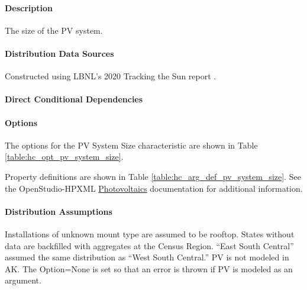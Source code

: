 \paragraph{Description}
% 
The size of the PV system.

\paragraph{Distribution Data Sources}
% 
Constructed using LBNL's 2020 Tracking the Sun report \citep{LBNLTTS2019}.

\paragraph{Direct Conditional Dependencies}


\paragraph{Options}
The options for the PV System Size characteristic are shown in Table \ref{table:hc_opt_pv_system_size}.



Property definitions are shown in Table \ref{table:hc_arg_def_pv_system_size}. See the OpenStudio-HPXML \href{https://openstudio-hpxml.readthedocs.io/en/v1.10.0/workflow_inputs.html#hpxml-photovoltaics}{Photovoltaics} documentation for additional information.



\paragraph{Distribution Assumptions}
% 
Installations of unknown mount type are assumed to be rooftop. States without data are backfilled with aggregates at the Census Region. ``East South Central'' assumed the same distribution as ``West South Central.''
PV is not modeled in AK. The Option=None is set so that an error is thrown if PV is modeled as an argument.
